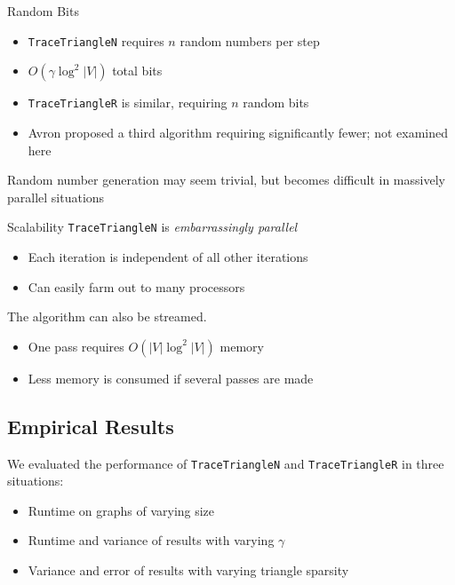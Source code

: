\documentclass{beamer}
\begin{document}
\begin{frame}{Random Bits}
    \begin{itemize}
        \item \texttt{TraceTriangleN} requires $n$ random numbers per step
        \item $O(\gamma \log^2 |V|)$ total bits
        \item \texttt{TraceTriangleR} is similar, requiring $n$ random bits
        \item Avron proposed a third algorithm requiring significantly fewer; not examined here
    \end{itemize}
    Random number generation may seem trivial, but becomes difficult in massively parallel situations
\end{frame}

\begin{frame}{Scalability}
    \texttt{TraceTriangleN} is \textit{embarrassingly parallel}
    \begin{itemize}
        \item Each iteration is independent of all other iterations
        \item Can easily farm out to many processors
    \end{itemize}
    The algorithm can also be streamed.
    \begin{itemize}
        \item One pass requires $O(|V| \log^2 |V|)$ memory
        \item Less memory is consumed if several passes are made
    \end{itemize}
\end{frame}

\subsection{Empirical Results}

\begin{frame}
    We evaluated the performance of \texttt{TraceTriangleN} and \texttt{TraceTriangleR} in three situations:
    
    \begin{itemize}
        \item Runtime on graphs of varying size
        \item Runtime and variance of results with varying $\gamma$
        \item Variance and error of results with varying triangle sparsity
    \end{itemize}
\end{frame}
\end{document}
